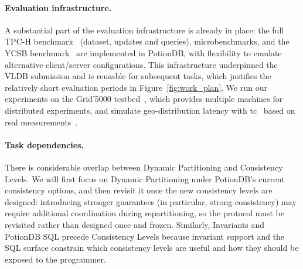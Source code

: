 \paragraph{Evaluation infrastructure.}
A substantial part of the evaluation infrastructure is already in place: the full TPC-H benchmark~\cite{tpch} (dataset, updates and queries), microbenchmarks, and the YCSB benchmark~\cite{ycsb} are implemented in PotionDB, with flexibility to emulate alternative client/server configurations.
This infrastructure underpinned the VLDB submission and is reusable for subsequent tasks, which justifies the relatively short evaluation periods in Figure~\ref{fig:work_plan}.
We run our experiments on the Grid'5000 testbed~\cite{Grid5000}, which provides multiple machines for distributed experiments, and simulate geo-distribution latency with tc~\cite{tc} based on real measurements~\cite{AWSLatency}.
%

\paragraph{Task dependencies.}
There is considerable overlap between Dynamic Partitioning and Consistency Levels.
We will first focus on Dynamic Partitioning under PotionDB's current consistency options, and then revisit it once the new consistency levels are designed: introducing stronger guarantees (in particular, strong consistency) may require additional coordination during repartitioning, so the protocol must be revisited rather than designed once and frozen.
Similarly, Invariants and PotionDB SQL precede Consistency Levels because invariant support and the SQL surface constrain which consistency levels are useful and how they should be exposed to the programmer.


